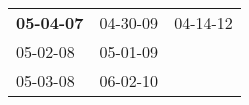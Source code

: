 \begin{supertabular}{p{0.33\columnwidth}p{0.33\columnwidth}p{0.33\columnwidth}}
 \textbf{05-04-07\textsuperscript{}} &  04-30-09\textsuperscript{} &  04-14-12\textsuperscript{} \\
          05-02-08\textsuperscript{} &  05-01-09\textsuperscript{} &                             \\
          05-03-08\textsuperscript{} &  06-02-10\textsuperscript{} &                             \\
\end{supertabular}

